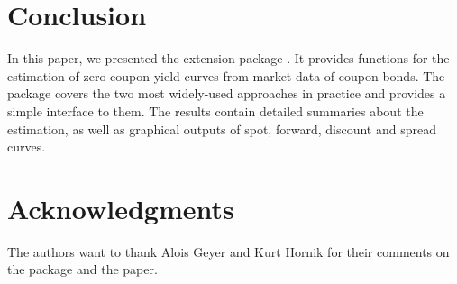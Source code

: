 \section{Conclusion}
\label{sec:conclusion}

In this paper, we presented the  extension package . It provides functions for the estimation of zero-coupon yield curves from market data of coupon bonds. The package covers the two most widely-used approaches in practice and provides a simple interface to them. The results contain detailed summaries about the estimation, as well as graphical outputs of spot, forward, discount and spread curves.


\section*{Acknowledgments}

The authors want to thank Alois Geyer and Kurt Hornik for their comments on the package and the paper.



